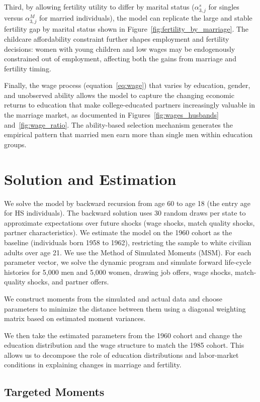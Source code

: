 \documentclass[12pt]{article}
\begin{document}
Third, by allowing fertility utility to differ by marital status ($\alpha_{3,j}^s$ for singles versus $\alpha_{3,j}^M$ for married individuals), the model can replicate the large and stable fertility gap by marital status shown in Figure~\ref{fig:fertility_by_marriage}. The childcare affordability constraint further shapes employment and fertility decisions: women with young children and low wages may be endogenously constrained out of employment, affecting both the gains from marriage and fertility timing.

Finally, the wage process (equation~\ref{eq:wage}) that varies by education, gender, and unobserved ability allows the model to capture the changing economic returns to education that make college-educated partners increasingly valuable in the marriage market, as documented in Figures~\ref{fig:wages_husbands} and~\ref{fig:wage_ratio}. The ability-based selection mechanism generates the empirical pattern that married men earn more than single men within education groups.

\section{Solution and Estimation} \label{sec:estimation}

We solve the model by backward recursion from age 60 to age 18 (the entry age for HS individuals). The backward solution uses 30 random draws per state to approximate expectations over future shocks (wage shocks, match quality shocks, partner characteristics). We estimate the model on the 1960 cohort as the baseline (individuals born 1958 to 1962), restricting the sample to white civilian adults over age 21. We use the Method of Simulated Moments (MSM). For each parameter vector, we solve the dynamic program and simulate forward life-cycle histories for 5,000 men and 5,000 women, drawing job offers, wage shocks, match-quality shocks, and partner offers.

We construct moments from the simulated and actual data and choose parameters to minimize the distance between them using a diagonal weighting matrix based on estimated moment variances.

We then take the estimated parameters from the 1960 cohort and change the education distribution and the wage structure to match the 1985 cohort. This allows us to decompose the role of education distributions and labor-market conditions in explaining changes in marriage and fertility.

\subsection{Targeted Moments}
\end{document}
